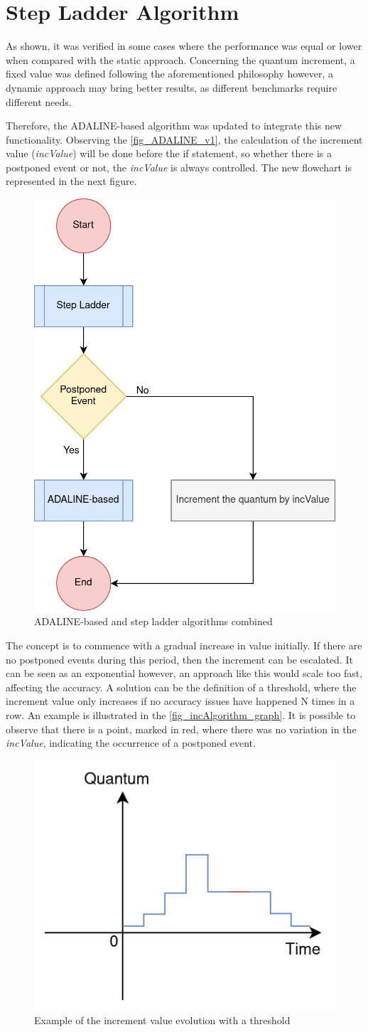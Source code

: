 \section{Step Ladder Algorithm}

As shown, it was verified in some cases where the performance was equal or lower when compared with the static approach. Concerning the quantum 
increment, a fixed value was defined following the aforementioned philosophy however, a dynamic approach may bring better results, as different 
benchmarks require different needs. 

Therefore, the ADALINE-based algorithm was updated to integrate this new functionality. Observing the \autoref{fig_ADALINE_v1}, the calculation of the 
increment value (\textit{incValue}) will be done before the if statement, so whether there is a postponed event or not, the \textit{incValue} is always controlled. 
The new flowchart is represented in the next figure.

\begin{figure}[H]
	\centering
 	\includegraphics[width=0.32\linewidth]{Images/ADALINE_v2.png}
 	\caption{ADALINE-based and step ladder algorithms combined}
	 \label{fig_ADALINE_v2}
\end{figure}

The concept is to commence with a gradual increase in value initially. If there are no postponed events during this period, then the increment 
can be escalated. It can be seen as an exponential however, an approach like this would scale too fast, affecting the accuracy. A solution can be 
the definition of a threshold, where the increment value only increases if no accuracy issues have happened N times in a row. An example is 
illustrated in the \autoref{fig_incAlgorithm_graph}. It is possible to observe that there is a point, marked in red, 
where there was no variation in the \textit{incValue}, indicating the occurrence of a postponed event.

\begin{figure}[h!]
	\centering
 	\includegraphics[width=0.4\linewidth]{Images/incAlgorithm_graph.png}
 	\caption{Example of the increment value evolution with a threshold}
	 \label{fig_incAlgorithm_graph}
\end{figure}

